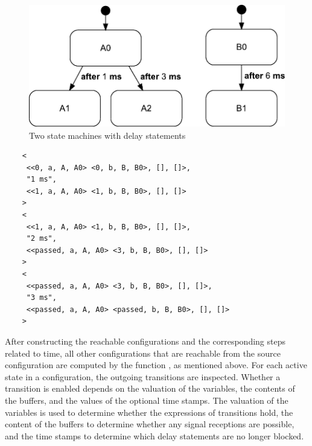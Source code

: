 \begin{figure}[hbt]
\centering
\includegraphics[scale=.45]{prototype-semantics/figs/delays}
\caption{Two state machines with delay statements}
\label{fig:prototype-semantics:delays}
\end{figure}

\begin{listing}
  \lstset{
    language=cs,
    caption=Steps representing the passing of time,
    label=lst:prototype-semantics:time_steps,
    numbers=none
  }
  \begin{lstlisting}
    <
     <<0, a, A, A0> <0, b, B, B0>, [], []>,
     "1 ms",
     <<1, a, A, A0> <1, b, B, B0>, [], []>
    >
    <
     <<1, a, A, A0> <1, b, B, B0>, [], []>,
     "2 ms",
     <<passed, a, A, A0> <3, b, B, B0>, [], []>
    >
    <
     <<passed, a, A, A0> <3, b, B, B0>, [], []>,
     "3 ms",
     <<passed, a, A, A0> <passed, b, B, B0>, [], []>
    >
  \end{lstlisting}
\end{listing}

After constructing the reachable configurations and the corresponding steps related to time, all other configurations that are reachable from the source configuration are computed by the function , as mentioned above.
For each active state in a configuration, the outgoing transitions are inspected.
Whether a transition is enabled depends on the valuation of the variables, the contents of the buffers, and the values of the optional time stamps.
The valuation of the variables is used to determine whether the expressions of transitions hold, the content of the buffers to determine whether any signal receptions are possible, and the time stamps to determine which delay statements are no longer blocked.

